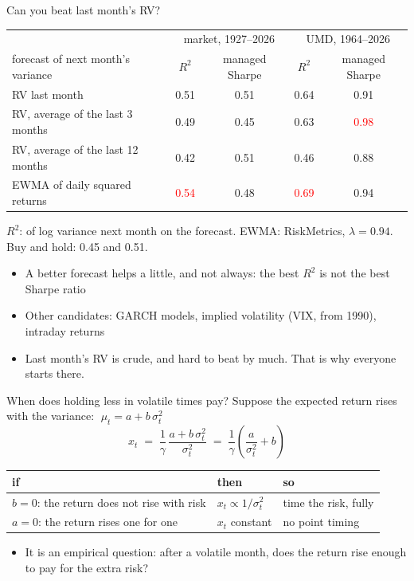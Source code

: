 \documentclass[aspectratio=169,10pt]{beamer}
\begin{document}
\begin{frame}{Can you beat last month's RV?}
\vskip 2pt
\begin{center}
\renewcommand{\arraystretch}{1.3}
\begin{tabular}{lcccc}
\toprule
 & \multicolumn{2}{c}{market, 1927--2026} & \multicolumn{2}{c}{UMD, 1964--2026} \\
forecast of next month's variance & $R^{2}$ & managed Sharpe & $R^{2}$ & managed Sharpe \\
\midrule
RV last month & 0.51 & 0.51 & 0.64 & 0.91 \\
RV, average of the last 3 months & 0.49 & 0.45 & 0.63 & \textcolor{red}{0.98} \\
RV, average of the last 12 months & 0.42 & 0.51 & 0.46 & 0.88 \\
EWMA of daily squared returns & \textcolor{red}{0.54} & 0.48 & \textcolor{red}{0.69} & 0.94 \\
\bottomrule
\end{tabular}
\end{center}
{\small $R^{2}$: of log variance next month on the forecast. EWMA: RiskMetrics, $\lambda = 0.94$. Buy and hold: 0.45 and 0.51.}
\vskip 8pt
\begin{itemize}
\item A better forecast helps a little, and not always: the best $R^{2}$ is not the best Sharpe ratio
\vskip 4pt
\item Other candidates: GARCH models, implied volatility (VIX, from 1990), intraday returns
\vskip 4pt
\item Last month's RV is crude, and hard to beat by much. That is why everyone starts there.
\end{itemize}
\end{frame}

\begin{frame}[label=when]{When does holding less in volatile times pay?}
Suppose the expected return rises with the variance: $\;\mu_{t} = a + b\,\sigma_{t}^{2}$
\[ x_{t} \;=\; \frac{1}{\gamma}\,\frac{a + b\,\sigma_{t}^{2}}{\sigma_{t}^{2}} \;=\; \frac{1}{\gamma}\left(\frac{a}{\sigma_{t}^{2}} + b\right) \]
\vskip 4pt
\begin{center}
\renewcommand{\arraystretch}{1.4}
\begin{tabular}{lll}
\toprule
if & then & so \\
\midrule
$b = 0$: the return does not rise with risk & $x_{t} \propto 1/\sigma_{t}^{2}$ & time the risk, fully \\
$a = 0$: the return rises one for one & $x_{t}$ constant & no point timing \\
\bottomrule
\end{tabular}
\end{center}
\vskip 8pt
\begin{itemize}
\item It is an empirical question: after a volatile month, does the return rise enough to pay for the extra risk?
\end{itemize}
\end{frame}
\end{document}
